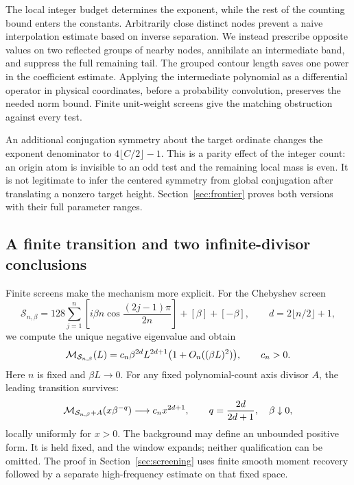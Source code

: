 The local integer budget determines the exponent, while the
rest of the counting bound enters the constants. Arbitrarily
close distinct nodes prevent a naive interpolation estimate
based on inverse separation. We instead prescribe opposite
values on two reflected groups of nearby nodes, annihilate
an intermediate band, and suppress the full remaining tail.
The grouped contour length saves one power in the coefficient
estimate. Applying the intermediate polynomial as a differential
operator in physical coordinates, before a probability
convolution, preserves the needed norm bound. Finite unit-weight
screens give the matching obstruction against every test.

An additional conjugation symmetry about the target ordinate
changes the exponent denominator to \(4\lfloor C/2\rfloor-1\).
This is a parity effect of the integer count: an origin atom
is invisible to an odd test and the remaining local mass is
even. It is not legitimate to infer the centered symmetry
from global conjugation after translating a nonzero target
height. Section~\ref{sec:frontier} proves both versions with
their full parameter ranges.

\subsection{A finite transition and two infinite-divisor conclusions}
Finite screens make the mechanism more explicit. For the
Chebyshev screen
\[
 \mathcal S_{n,\beta}
 =128\sum_{j=1}^n
       \left[i\beta n\cos\frac{(2j-1)\pi}{2n}\right]
       +[\beta]+[-\beta],
 \qquad d=2\lfloor n/2\rfloor+1,
\]
we compute the unique negative eigenvalue and obtain
\[
 \mathcal M_{\mathcal S_{n,\beta}}(L)
 =c_n\beta^{2d}L^{2d+1}\bigl(1+O_n((\beta L)^2)\bigr),
 \qquad c_n>0.
\]
Here \(n\) is fixed and \(\beta L\to0\). For any fixed
polynomial-count axis divisor \(A\), the leading transition
survives:
\begin{equation}\label{intro:fixed-background}
 \mathcal M_{\mathcal S_{n,\beta}+A}(x\beta^{-q})
 \longrightarrow c_nx^{2d+1},\qquad
 q=\frac{2d}{2d+1},\quad\beta\downarrow0,
\end{equation}
locally uniformly for \(x>0\). The background may define
an unbounded positive form. It is held fixed, and the
window expands; neither qualification can be omitted.
The proof in Section~\ref{sec:screening} uses finite smooth
moment recovery followed by a separate high-frequency
estimate on that fixed space.

